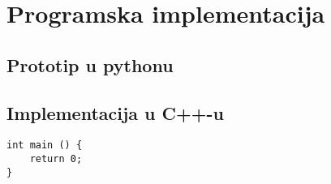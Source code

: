 \chapter{Programska implementacija}
\section{Prototip u pythonu}
\section{Implementacija u C++-u}
\lstset{language=C++, tabsize=2}
\begin{lstlisting}
int main () {
	return 0;
}
\end{lstlisting}